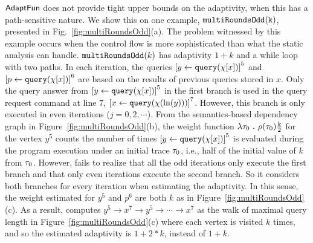 
$\textsf{AdaptFun}$ does not  provide tight upper bounds on the adaptivity, when this has a path-sensitive nature. We show this on one example, $\mathtt{multiRoundsOdd(k)}$, presented in Fig.~\ref{fig:multiRoundsOdd}(a). %
The problem witnessed by this example occurs when the control flow is more sophisticated than what the static analysis can handle. 
$\mathtt{multiRoundsOdd}(k)$
has adaptivity $1 + k$ and a  while loop with two paths.
In each iteration, the queries $\clabel{\assign{y}{\query(\chi[x])}}^{5}$
and $\clabel{\assign{p}{\query(\chi[x])}}^{6}$ are based on the results of previous queries stored in $x$.
Only the query answer from $\clabel{\assign{y}{\query(\chi[x])}}^{5}$ in the first branch
is used in the query request command at line $7$, $\clabel{\assign{x}{\query(\chi(\ln(y)))} }^{7}$.
However, this branch is only executed in even iterations ($j = 0, 2, \cdots $).
From the semantics-based dependency graph in Figure~\ref{fig:multiRoundsOdd}(b),
the weight function $\lambda \mathtt{\tau}_0 ~.~ \rho(\mathtt{\tau}_0) \frac{k}{2}$ for the vertex $y^5$ counts the
number of times $\clabel{\assign{y}{\query(\chi[x])}}^{5}$ is evaluated during the program execution under an initial trace $\mathtt{\tau}_0$, i.e., half of the initial value of $k$ from $\mathtt{\tau}_0$.
However, {\THESYSTEM} fails to realize that all the odd iterations only execute the first branch
and that only even iterations execute the second branch. 
So it considers both branches for every iteration when estimating the adaptivity. 
In this sense, the weight estimated for $y^5$ and $p^6$ are both 
$k$ as in Figure~\ref{fig:multiRoundsOdd}(c).
As a result, {\THESYSTEM} computes $y^5  \to x^7  \to y^5  \to \cdots \to x^7 $
as the walk of maximal query length in Figure~\ref{fig:multiRoundsOdd}(c)
where each vertex is visited $k$ times, and so the estimated adaptivity is $1 + 2 * k$, instead of $1 + k$. 
%




